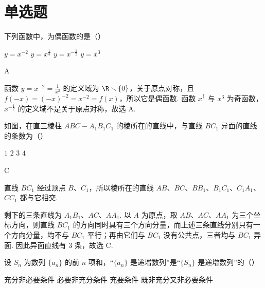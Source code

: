\section{单选题}

\begin{problem}
下列函数中，为偶函数的是（\quad）

\choices
    {\(y=x^{-2}\)}
    {\(y=x^{\frac13}\)}
    {\(y=x^{-\frac12}\)}
    {\(y=x^3\)}
\end{problem}

\begin{answer}
A
\end{answer}

\begin{solution}
函数 \(y=x^{-2}=\frac1{x^2}\) 的定义域为 \(\R\smallsetminus\{0\}\)，关于原点对称，且 \(f(-x)=(-x)^{-2}=x^{-2}=f(x)\)，所以它是偶函数. 函数 \(x^{\frac{1}{3}}\) 与 \(x^3\) 为奇函数，\(x^{-\frac{1}{2}}\) 的定义域不是关于原点对称，故选 A.
\end{solution}

\begin{problem}
如图，在直三棱柱 \(ABC-A_1B_1C_1\) 的棱所在的直线中，与直线 \(BC_1\) 异面的直线的条数为（\quad）


\choices
    {\(1\)}
    {\(2\)}
    {\(3\)}
    {\(4\)}
\end{problem}

\begin{answer}
C
\end{answer}

\begin{solution}
直线 \(BC_1\) 经过顶点 \(B\)、\(C_1\)，所以棱所在的直线 \(AB\)、\(BC\)、\(BB_1\)、\(B_1C_1\)、\(C_1A_1\)、\(CC_1\) 都与它相交.

剩下的三条直线为 \(A_1B_1\)、\(AC\)、\(AA_1\). 以 \(A\) 为原点，取 \(AB\)、\(AC\)、\(AA_1\) 为三个坐标方向，则直线 \(BC_1\) 的方向同时具有三个方向分量，而上述三条直线分别只有一个方向分量，均不与 \(BC_1\) 平行；再由它们与 \(BC_1\) 没有公共点，三者均与 \(BC_1\) 异面. 因此异面直线有 \(3\) 条，故选 C.
\end{solution}

\begin{problem}
设 \(S_n\) 为数列 \(\{a_n\}\) 的前 \(n\) 项和，“\(\{a_n\}\) 是递增数列”是“\(\{S_n\}\) 是递增数列”的（\quad）

\choices
    {充分非必要条件}
    {必要非充分条件}
    {充要条件}
    {既非充分又非必要条件}
\end{problem}

